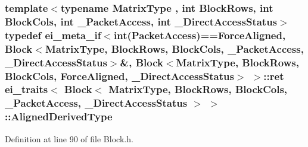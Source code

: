 \hypertarget{structei__traits_3_01_block_3_01_matrix_type_00_01_block_rows_00_01_block_cols_00_01___packet_ac479d6b4c208794fdc7c9c0ab098ad674_a821fd9bdfe4763c0f904308de2332b35}{
\subsubsection[{Aligned\-Derived\-Type}]{\setlength{\rightskip}{0pt plus 5cm}template$<$typename Matrix\-Type , int Block\-Rows, int Block\-Cols, int \-\_\-\-Packet\-Access, int \-\_\-\-Direct\-Access\-Status$>$ typedef {\bf ei\-\_\-meta\-\_\-if}$<${\bf int}({\bf Packet\-Access})=={\bf Force\-Aligned}, {\bf Block}$<$Matrix\-Type, Block\-Rows, Block\-Cols, \-\_\-\-Packet\-Access, \-\_\-\-Direct\-Access\-Status$>$\&, {\bf Block}$<$Matrix\-Type, Block\-Rows, Block\-Cols, {\bf Force\-Aligned}, \-\_\-\-Direct\-Access\-Status$>$ $>$\-::{\bf ret} {\bf ei\-\_\-traits}$<$ {\bf Block}$<$ Matrix\-Type, Block\-Rows, Block\-Cols, \-\_\-\-Packet\-Access, \-\_\-\-Direct\-Access\-Status $>$ $>$\-::{\bf Aligned\-Derived\-Type}}}\label{structei__traits_3_01_block_3_01_matrix_type_00_01_block_rows_00_01_block_cols_00_01___packet_ac479d6b4c208794fdc7c9c0ab098ad674_a821fd9bdfe4763c0f904308de2332b35}


Definition at line 90 of file Block.\-h.

